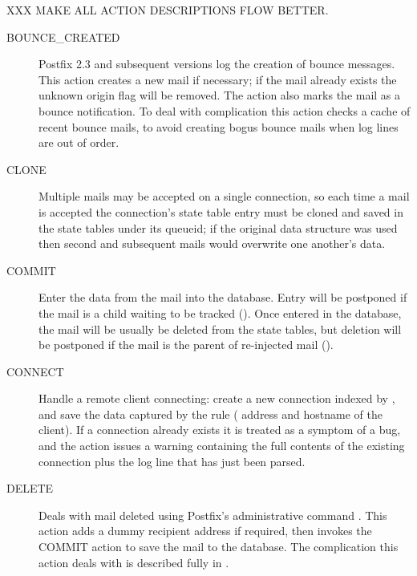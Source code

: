 XXX MAKE ALL ACTION DESCRIPTIONS FLOW BETTER\@.

\begin{description}

    \item [BOUNCE\_CREATED] Postfix 2.3 and subsequent versions log the
        creation of bounce messages.  This action creates a new mail if
        necessary; if the mail already exists the unknown origin flag will
        be removed.  The action also marks the mail as a bounce
        notification.  To deal with complication  this
        action checks a cache of recent bounce mails, to avoid creating
        bogus bounce mails when log lines are out of order.

    \item [CLONE] Multiple mails may be accepted on a single connection, so
        each time a mail is accepted the connection's state table entry
        must be cloned and saved in the state tables under its queueid; if
        the original data structure was used then second and subsequent
        mails would overwrite one another's data.

    \item [COMMIT] Enter the data from the mail into the database.  Entry
        will be postponed if the mail is a child waiting to be tracked
        ().  Once entered in the database,
        the mail will be usually be deleted from the state tables, but
        deletion will be postponed if the mail is the parent of re-injected
        mail ().

    \item [CONNECT] Handle a remote client connecting: create a new
        connection indexed by  , and save the
        data captured by the rule ( address and hostname of the
        client).  If a connection already exists it is treated as a symptom
        of a bug, and the action issues a warning containing the full
        contents of the existing connection plus the log line that has
        just been parsed.

    \item [DELETE] Deals with mail deleted using Postfix's administrative
        command .  This action adds a dummy recipient
        address if required, then invokes the COMMIT action to save the
        mail to the database.  The complication this action deals with is
        described fully in .


\end{description}
